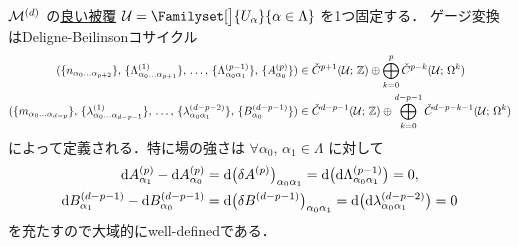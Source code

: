 \documentclass[TQFT_main]{subfiles}
\begin{document}
$\mathcal{M}^{(d)}$ の\hyperref[def:good-cover]{良い被覆} $\mathcal{U} = \Familyset[\big]{U_\alpha}{\alpha \in \Lambda}$ を1つ固定する．
ゲージ変換はDeligne-Beilinsonコサイクル
\begin{align}
    (\{n_{\alpha_0 \dots \alpha_{p+2}}\},\, \{\Lambda^{(1)}_{\alpha_0 \dots \alpha_{p+1}}\},\, \dots ,\, \{\Lambda^{(p-1)}_{\alpha_0\alpha_1}\},\, \{A^{(p)}_{\alpha_0}\}) &\in \check{C}^{p+1}(\mathcal{U};\, \mathbb{Z}) \oplus \bigoplus_{k=0}^{p} \check{C}^{p-k}(\mathcal{U};\, \Omega^k) \\
    (\{m_{\alpha_0 \dots \alpha_{d-p}}\},\, \{\lambda^{(1)}_{\alpha_0 \dots \alpha_{d-p-1}}\},\, \dots ,\, \{\lambda^{(d-p-2)}_{\alpha_0\alpha_1}\},\, \{B^{(d-p-1)}_{\alpha_0}\}) &\in \check{C}^{d-p-1}(\mathcal{U};\, \mathbb{Z}) \oplus \bigoplus_{k=0}^{d-p-1} \check{C}^{d-p-k-1}(\mathcal{U};\, \Omega^k)
\end{align}
によって定義される．特に場の強さは $\forall \alpha_0,\, \alpha_1 \in \Lambda$ に対して
\begin{align}
    \dd{A^{(p)}_{\alpha_1}} - \dd{A^{(p)}_{\alpha_0}} &= \dd{\bigl(\delta A^{(p)}\bigr)_{\alpha_0\alpha_1}} = \dd{\bigl(\dd{\Lambda^{(p-1)}_{\alpha_0\alpha_1}}\bigr)} = 0, \\
    \dd{B^{(d-p-1)}_{\alpha_1}} - \dd{B^{(d-p-1)}_{\alpha_0}} &= \dd{\bigl(\delta B^{(d-p-1)}\bigr)_{\alpha_0\alpha_1}} = \dd{\bigl(\dd{\lambda^{(d-p-2)}_{\alpha_0\alpha_1}}\bigr)} = 0
\end{align}
を充たすので大域的にwell-definedである．
\end{document}
